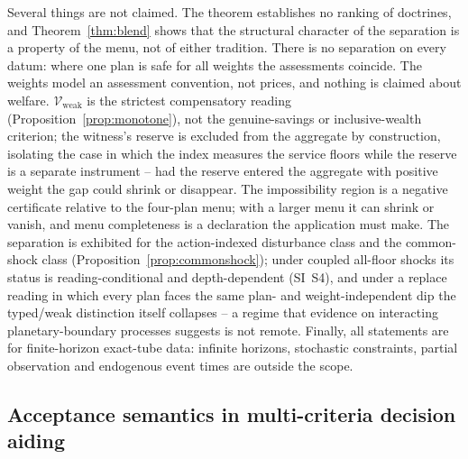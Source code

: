 \documentclass[preprint,11pt,authoryear]{elsarticle}
\theoremstyle{definition}
\theoremstyle{remark}
\newcommand{\Vweak}{\mathcal{V}_{\mathrm{weak}}}
\begin{document}
Several things are not claimed. The theorem establishes no ranking of doctrines, and Theorem~\ref{thm:blend} shows that the structural character of the separation is a property of the menu, not of either tradition. There is no separation on every datum: where one plan is safe for all weights the assessments coincide. The weights model an assessment convention, not prices, and nothing is claimed about welfare. $\Vweak$ is the strictest compensatory reading (Proposition~\ref{prop:monotone}), not the genuine-savings or inclusive-wealth criterion; the witness's reserve is excluded from the aggregate by construction, isolating the case in which the index measures the service floors while the reserve is a separate instrument -- had the reserve entered the aggregate with positive weight the gap could shrink or disappear. The impossibility region is a negative certificate relative to the four-plan menu; with a larger menu it can shrink or vanish, and menu completeness is a declaration the application must make. The separation is exhibited for the action-indexed disturbance class and the common-shock class (Proposition~\ref{prop:commonshock}); under coupled all-floor shocks its status is reading-conditional and depth-dependent (SI~S4), and under a replace reading in which every plan faces the same plan- and weight-independent dip the typed/weak distinction itself collapses -- a regime that evidence on interacting planetary-boundary processes \citep{Lade2020} suggests is not remote. Finally, all statements are for finite-horizon exact-tube data: infinite horizons, stochastic constraints, partial observation and endogenous event times are outside the scope.

\subsection{Acceptance semantics in multi-criteria decision aiding}\label{sec:mcda}
\end{document}
